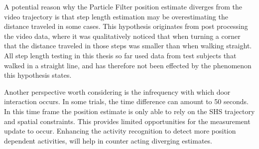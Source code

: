 A potential reason why the Particle Filter position estimate diverges from the video trajectory is that step length estimation may be overestimating the distance traveled in some cases. This hypothesis originates from post processing the video data, where it was qualitatively noticed that when turning a corner that the distance traveled in those steps was smaller than when walking straight. All step length testing in this thesis so far used data from test subjects that walked in a straight line, and has therefore not been effected by the phenomenon this hypothesis states.\par 

Another perspective worth considering is the infrequency with which door interaction occurs. In some trials, the time difference can amount to 50 seconds. In this time frame the position estimate is only able to rely on the SHS trajectory and spatial constraints. This provides limited opportunities for the measurement update to occur. Enhancing the activity recognition to detect more position dependent activities, will help in counter acting diverging estimates. 

\newpage
 
